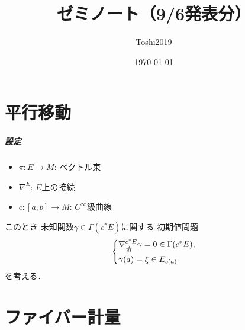 \documentclass[leqno, 10pt, a4paper, dvipdfmx]{jsarticle}
\title{ゼミノート（9/6発表分）}
\author{Toshi2019}
\date{\today}
\theoremstyle{definition}
\numberwithin{equation}{section}
\theoremstyle{mystyle}
\begin{document}
\maketitle

\section{平行移動}

\subparagraph{設定}
\begin{itemize}
    \item \(\pi\colon E\to M\): ベクトル束
    \item \(\nabla^{E}\): \(E\)上の接続
    \item \(c\colon [a,b]\to M\): \(C^{\infty}\)級曲線
\end{itemize}
このとき
未知関数\(\gamma\in \Gamma(c^{\ast}E)\)に関する
初期値問題
\begin{equation}
    \begin{dcases}
        \nabla^{c^{\ast}E}_{\frac{d}{dt}}\gamma=0\in\Gamma(c^{\ast}E),\\
        \gamma(a)=\xi\in E_{c(a)}    
    \end{dcases}
\end{equation}
を考える．

\section{ファイバー計量}
\end{document}
